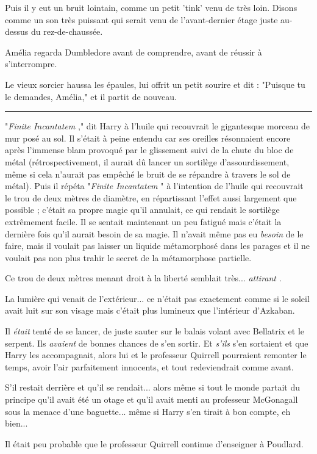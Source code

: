 Puis il y eut un bruit lointain, comme un petit 'tink' venu de très loin. Disons comme un son très puissant qui serait venu de l'avant-dernier étage juste au-dessus du rez-de-chaussée.

Amélia regarda Dumbledore avant de comprendre, avant de réussir à s'interrompre.

Le vieux sorcier haussa les épaules, lui offrit un petit sourire et dit : "Puisque tu le demandes, Amélia," et il partit de nouveau.
\par\noindent\rule{\textwidth}{0.4pt}
"\emph{Finite Incantatem} ," dit Harry à l'huile qui recouvrait le gigantesque morceau de mur posé au sol. Il s'était à peine entendu car ses oreilles résonnaient encore après l'immense blam provoqué par le glissement suivi de la chute du bloc de métal (rétrospectivement, il aurait dû lancer un sortilège d'assourdissement, même si cela n'aurait pas empêché le bruit de se répandre à travers le sol de métal). Puis il répéta "\emph{Finite Incantatem} " à l'intention de l'huile qui recouvrait le trou de deux mètres de diamètre, en répartissant l'effet aussi largement que possible ; c'était sa propre magie qu'il annulait, ce qui rendait le sortilège extrêmement facile. Il se sentait maintenant un peu fatigué mais c'était la dernière fois qu'il aurait besoin de sa magie. Il n'avait même pas eu \emph{besoin}  de le faire, mais il voulait pas laisser un liquide métamorphosé dans les parages et il ne voulait pas non plus trahir le secret de la métamorphose partielle.

Ce trou de deux mètres menant droit à la liberté semblait très... \emph{attirant} .

La lumière qui venait de l'extérieur... ce n'était pas exactement comme si le soleil avait luit sur son visage mais c'était plus lumineux que l'intérieur d'Azkaban.

Il \emph{était}  tenté de se lancer, de juste sauter sur le balais volant avec Bellatrix et le serpent. Ils \emph{avaient}  de bonnes chances de s'en sortir. Et \emph{s'ils}  s'en sortaient et que Harry les accompagnait, alors lui et le professeur Quirrell pourraient remonter le temps, avoir l'air parfaitement innocents, et tout redeviendrait comme avant.

S'il restait derrière et qu'il se rendait... alors même si tout le monde partait du principe qu'il avait été un otage et qu'il avait menti au professeur McGonagall sous la menace d'une baguette... même si Harry s'en tirait à bon compte, eh bien...

Il était peu probable que le professeur Quirrell continue d'enseigner à Poudlard.

